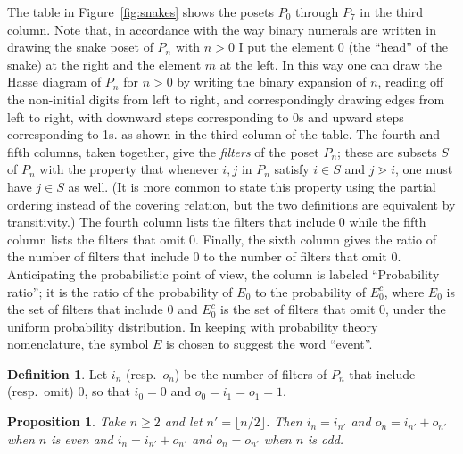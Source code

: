 \documentclass[12pt]{article}
\theoremstyle{plain}
\newtheorem{proposition}[theorem]{Proposition}
\theoremstyle{definition}
\newtheorem{definition}[theorem]{Definition}
\theoremstyle{remark}
\begin{document}
The table in Figure~\ref{fig:snakes} shows 
the posets $P_0$ through $P_7$ in the third column.
Note that, in accordance with the way binary numerals are written
in drawing the snake poset of $P_n$ with $n>0$ I put the element 0 
(the ``head'' of the snake) at the right and the element $m$ at the left.
In this way one can draw the Hasse diagram of $P_n$
for $n>0$ by writing the binary expansion of $n$,
reading off the non-initial digits from left to right,
and correspondingly drawing edges from left to right,
with downward steps corresponding to 0s and upward steps corresponding to 1s.
as shown in the third column of the table.
The fourth and fifth columns, taken together,
give the {\em filters} of the poset $P_n$;
these are subsets $S$ of $P_n$ with the property that
whenever $i,j$ in $P_n$ satisfy $i \in S$ and $j \gtrdot i$,
one must have $j \in S$ as well.
(It is more common to state this property
using the partial ordering instead of the covering relation,
but the two definitions are equivalent by transitivity.)
The fourth column lists the filters that include 0
while the fifth column lists the filters that omit 0.
Finally, the sixth column gives the ratio of
the number of filters that include 0
to the number of filters that omit 0.
Anticipating the probabilistic point of view,
the column is labeled ``Probability ratio'';
it is the ratio of the probability of $E_0$ to the probability of $E_0^c$,
where $E_0$ is the set of filters that include 0
and $E_0^c$ is the set of filters that omit 0,
under the uniform probability distribution.
In keeping with probability theory nomenclature,
the symbol $E$ is chosen to suggest the word ``event''.

\begin{definition}
Let $i_n$ (resp.\ $o_n$) be the number of filters of $P_n$ 
that include (resp.\ omit) 0, so that $i_0 = 0$ and $o_0 = i_1 = o_1 = 1$.
\end{definition}

\begin{proposition}
Take $n \geq 2$ and let $n' = \lfloor n/2 \rfloor$. Then
$i_{n} = i_{n'}$ and $o_{n} = i_{n'}+o_{n'}$ when $n$ is even and
$i_{n} = i_{n'}+o_{n'}$ and $o_{n} = o_{n'}$ when $n$ is odd.
\label{prop:recur}
\end{proposition}
\end{document}
